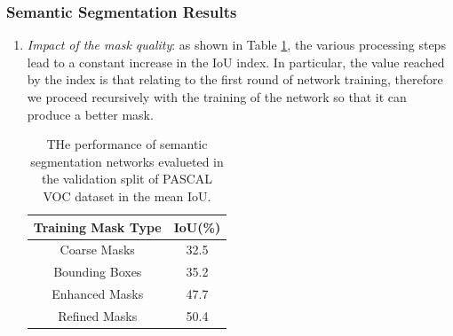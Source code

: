 \subsubsection{Semantic Segmentation Results}
\begin{enumerate}
    \item \emph{Impact of the mask quality}: as shown in Table \ref{IoU}, the various processing 
    steps lead to a constant increase in the IoU index. In particular, 
    the value reached by the index is that relating to the first round of 
    network training, therefore we proceed recursively with the training of 
    the network so that it can produce a better mask.
    \begin{table}[h!]
        \centering
        \begin{adjustbox}{max width=\textwidth}
        \begin{tabular}{|c|c|}
            \hline
            Training Mask Type & IoU(\%)\\
            \hline
            Coarse Masks & 32.5 \\
            Bounding Boxes & 35.2 \\
            Enhanced Masks & 47.7 \\
            Refined Masks & 50.4 \\
            \hline
        \end{tabular}
        \end{adjustbox}
        \caption{THe performance of semantic segmentation networks evalueted in the validation split of PASCAL VOC dataset in the mean IoU.}
        \label{IoU}
    \end{table}
    

\end{enumerate}

